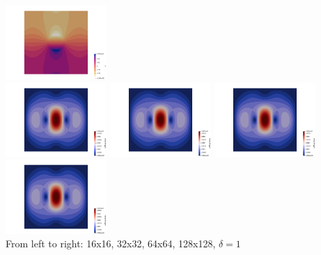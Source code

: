 \begin{center}
\includegraphics[width=3.84cm]{python_codes/fieldstone_78/results/sphere/p128}\\
\includegraphics[width=3.84cm]{python_codes/fieldstone_78/results/sphere/vel16}
\includegraphics[width=3.84cm]{python_codes/fieldstone_78/results/sphere/vel32}
\includegraphics[width=3.84cm]{python_codes/fieldstone_78/results/sphere/vel64}
\includegraphics[width=3.84cm]{python_codes/fieldstone_78/results/sphere/vel128}\\
{\captionfont From left to right: 16x16, 32x32, 64x64, 128x128, $\delta=1$}
\end{center}


